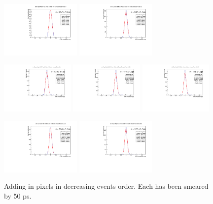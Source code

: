 \documentclass[twocolumn,aps,prd,reprint,superscriptaddress,floatfix]{revtex4-1}
\begin{document}
\begin{figure}[!htbp]
\centering
	\includegraphics[width=0.35\textwidth]{SKIROC_1_Pixels50.pdf}
	\includegraphics[width=0.35\textwidth]{SKIROC_2_Pixels50.pdf}
	
	\includegraphics[width=0.32\textwidth]{SKIROC_3_Pixels50.pdf}
	\includegraphics[width=0.32\textwidth]{SKIROC_4_Pixels50.pdf}
	\includegraphics[width=0.32\textwidth]{SKIROC_5_Pixels50.pdf}
	
	\includegraphics[width=0.35\textwidth]{SKIROC_6_Pixels50.pdf}
	\includegraphics[width=0.35\textwidth]{SKIROC_7_Pixels50.pdf}
	\caption{Adding in pixels in decreasing events order.
		Each has been smeared by 50 ps.}
	\label{fig:50psAll}
\end{figure}
\end{document}
